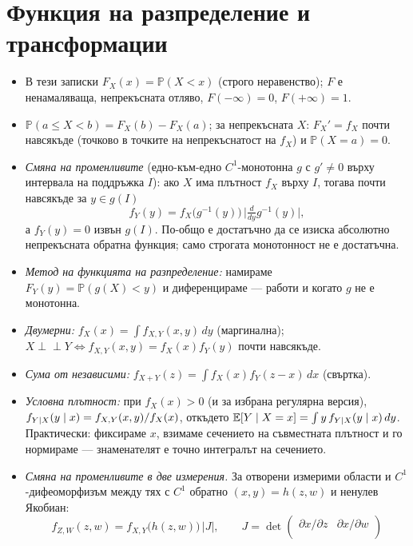\section{Функция на разпределение и трансформации}

\begin{itemize}\itemsep2pt
  \item В тези записки $F_X(x) = \mathbb{P}(X < x)$ (строго неравенство); $F$ е ненамаляваща,
        непрекъсната отляво, $F(-\infty)=0$, $F(+\infty)=1$.
  \item $\mathbb{P}(a \le X < b) = F_X(b) - F_X(a)$;\quad
        за непрекъсната $X$: $F_X'=f_X$ почти навсякъде (точково в точките на
        непрекъснатост на $f_X$) и $\mathbb{P}(X=a)=0$.
  \item \emph{Смяна на променливите} (едно-към-едно $C^1$-монотонна $g$ с
        $g'\ne0$ върху интервала на поддръжка $I$): ако $X$ има плътност $f_X$
        върху $I$, тогава почти навсякъде за $y\in g(I)$
        \[ f_Y(y) = f_X\big(g^{-1}(y)\big)\,\Big|\tfrac{d}{dy}g^{-1}(y)\Big| , \]
        а $f_Y(y)=0$ извън $g(I)$. По-общо е достатъчно да се изиска абсолютно
        непрекъсната обратна функция; само строгата монотонност не е достатъчна.
  \item \emph{Метод на функцията на разпределение:} намираме $F_Y(y)=\mathbb{P}(g(X)<y)$ и
        диференцираме — работи и когато $g$ не е монотонна.
  \item \emph{Двумерни:} $f_X(x) = \int f_{X,Y}(x,y)\,dy$ (маргинална);\quad
        $X \perp\!\!\!\perp Y \iff f_{X,Y}(x,y) = f_X(x) f_Y(y)$ почти навсякъде.
  \item \emph{Сума от независими:} $f_{X+Y}(z) = \int f_X(x) f_Y(z-x)\,dx$ (свъртка).
  \item \emph{Условна плътност:} при $f_X(x)>0$ (и за избрана регулярна версия),
        $f_{Y \mid X}(y \mid x) = f_{X,Y}(x,y)/f_X(x)$, откъдето
        $\mathbb{E}[Y \mid X = x] = \int y\, f_{Y \mid X}(y \mid x)\,dy$. Практически: фиксираме
        $x$, взимаме сечението на съвместната плътност и го нормираме — знаменателят е
        точно интегралът на сечението.
  \item \emph{Смяна на променливите в две измерения.} За отворени измерими области
        и $C^1$-дифеоморфизъм между тях с $C^1$ обратно
        $(x,y)=h(z,w)$ и ненулев Якобиан:
        \[ f_{Z,W}(z,w) = f_{X,Y}\big(h(z,w)\big)\,|J|, \qquad
           J = \det\begin{pmatrix}
             \partial x/\partial z & \partial x/\partial w \\

\end{pmatrix}\]
\end{itemize}
